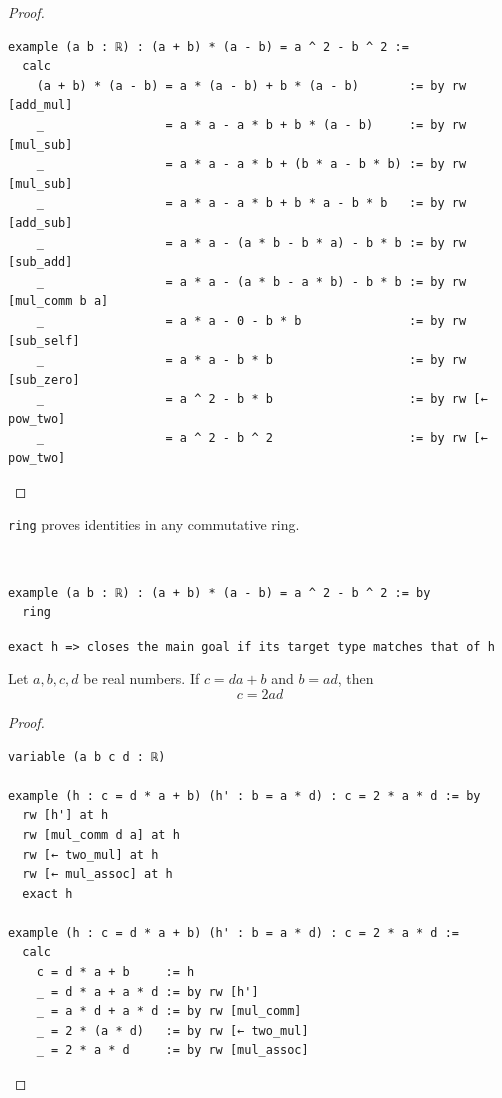 \documentclass{blog}
\begin{document}
\begin{proof}~
  \begin{verbatim}
example (a b : ℝ) : (a + b) * (a - b) = a ^ 2 - b ^ 2 :=
  calc
    (a + b) * (a - b) = a * (a - b) + b * (a - b)       := by rw [add_mul]
    _                 = a * a - a * b + b * (a - b)     := by rw [mul_sub]
    _                 = a * a - a * b + (b * a - b * b) := by rw [mul_sub]
    _                 = a * a - a * b + b * a - b * b   := by rw [add_sub]
    _                 = a * a - (a * b - b * a) - b * b := by rw [sub_add]
    _                 = a * a - (a * b - a * b) - b * b := by rw [mul_comm b a]
    _                 = a * a - 0 - b * b               := by rw [sub_self]
    _                 = a * a - b * b                   := by rw [sub_zero]
    _                 = a ^ 2 - b * b                   := by rw [← pow_two]
    _                 = a ^ 2 - b ^ 2                   := by rw [← pow_two]
\end{verbatim}
\end{proof}

\begin{definition}[ring]
  \verb|ring| proves identities in any commutative ring.
\end{definition}

\begin{example}~
  \begin{verbatim}
example (a b : ℝ) : (a + b) * (a - b) = a ^ 2 - b ^ 2 := by
  ring
\end{verbatim}
\end{example}

\begin{definition}[exact]
  \verb|exact h => closes the main goal if its target type matches that of h|
\end{definition}

\begin{proposition}
  Let $a, b, c, d$ be real numbers.
  If $c = d a + b$ and $b = a d$, then
  \begin{equation*}
    c = 2 a d
  \end{equation*}
\end{proposition}

\begin{proof}~
  \begin{verbatim}
variable (a b c d : ℝ)

example (h : c = d * a + b) (h' : b = a * d) : c = 2 * a * d := by
  rw [h'] at h
  rw [mul_comm d a] at h
  rw [← two_mul] at h
  rw [← mul_assoc] at h
  exact h

example (h : c = d * a + b) (h' : b = a * d) : c = 2 * a * d :=
  calc
    c = d * a + b     := h
    _ = d * a + a * d := by rw [h']
    _ = a * d + a * d := by rw [mul_comm]
    _ = 2 * (a * d)   := by rw [← two_mul]
    _ = 2 * a * d     := by rw [mul_assoc]
\end{verbatim}
\end{proof}
\end{document}

